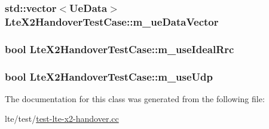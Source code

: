 \subsubsection[{\texorpdfstring{m\+\_\+ue\+Data\+Vector}{m_ueDataVector}}]{\setlength{\rightskip}{0pt plus 5cm}std\+::vector$<${\bf Ue\+Data}$>$ Lte\+X2\+Handover\+Test\+Case\+::m\+\_\+ue\+Data\+Vector\hspace{0.3cm}{\ttfamily [private]}}\hypertarget{classLteX2HandoverTestCase_a502c382f8e49ffd33916d0fb4a3002bd}{}\label{classLteX2HandoverTestCase_a502c382f8e49ffd33916d0fb4a3002bd}
\subsubsection[{\texorpdfstring{m\+\_\+use\+Ideal\+Rrc}{m_useIdealRrc}}]{\setlength{\rightskip}{0pt plus 5cm}bool Lte\+X2\+Handover\+Test\+Case\+::m\+\_\+use\+Ideal\+Rrc\hspace{0.3cm}{\ttfamily [private]}}\hypertarget{classLteX2HandoverTestCase_a3a6c8e1e087766873c9ff712fdedc9d4}{}\label{classLteX2HandoverTestCase_a3a6c8e1e087766873c9ff712fdedc9d4}
\subsubsection[{\texorpdfstring{m\+\_\+use\+Udp}{m_useUdp}}]{\setlength{\rightskip}{0pt plus 5cm}bool Lte\+X2\+Handover\+Test\+Case\+::m\+\_\+use\+Udp\hspace{0.3cm}{\ttfamily [private]}}\hypertarget{classLteX2HandoverTestCase_a70c8ee7faf2c84d6bad133cca4665fb4}{}\label{classLteX2HandoverTestCase_a70c8ee7faf2c84d6bad133cca4665fb4}


The documentation for this class was generated from the following file\+:\begin{DoxyCompactItemize}
\item 
lte/test/\hyperlink{test-lte-x2-handover_8cc}{test-\/lte-\/x2-\/handover.\+cc}\end{DoxyCompactItemize}
